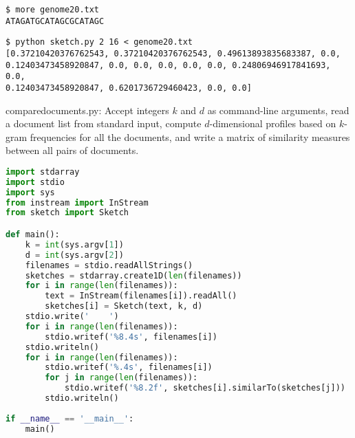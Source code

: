 \documentclass[8pt,a4paper,compress]{beamer}
\begin{document}
\begin{frame}[fragile]
\pause

\begin{lstlisting}[language={}]
$ more genome20.txt
ATAGATGCATAGCGCATAGC
\end{lstlisting}

\pause

\begin{lstlisting}[language={}]
$ python sketch.py 2 16 < genome20.txt 
[0.37210420376762543, 0.37210420376762543, 0.49613893835683387, 0.0, 
0.12403473458920847, 0.0, 0.0, 0.0, 0.0, 0.0, 0.24806946917841693, 0.0, 
0.12403473458920847, 0.6201736729460423, 0.0, 0.0]
\end{lstlisting}
\end{frame}

\begin{frame}[fragile]
\pause

\begin{framed}
\tiny comparedocuments.py: Accept integers $k$ and $d$ as command-line arguments, read a document list from standard input, compute $d$-dimensional profiles based on $k$-gram frequencies for all the documents, and write a matrix of similarity measures between all pairs of documents.
\end{framed}

\begin{lstlisting}[language=Python]
import stdarray
import stdio
import sys
from instream import InStream
from sketch import Sketch

def main():
    k = int(sys.argv[1])
    d = int(sys.argv[2])
    filenames = stdio.readAllStrings()
    sketches = stdarray.create1D(len(filenames))
    for i in range(len(filenames)):
        text = InStream(filenames[i]).readAll()
        sketches[i] = Sketch(text, k, d)
    stdio.write('    ')
    for i in range(len(filenames)):
        stdio.writef('%8.4s', filenames[i])
    stdio.writeln()
    for i in range(len(filenames)):
        stdio.writef('%.4s', filenames[i])
        for j in range(len(filenames)):
            stdio.writef('%8.2f', sketches[i].similarTo(sketches[j]))
        stdio.writeln()
    
if __name__ == '__main__':
    main()
\end{lstlisting}
\end{frame}
\end{document}
